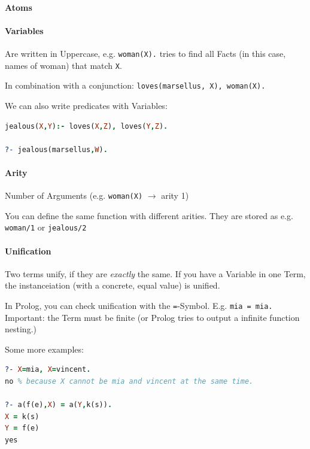 \paragraph{Atoms}


\paragraph{Variables}


Are written in Uppercase, e.g. \lstinline|woman(X).| tries to find all Facts (in this case, names of woman) that match \lstinline|X|.

In combination with a conjunction: \lstinline|loves(marsellus, X), woman(X).|

We can also write predicates with Variables: 
\begin{lstlisting}[language=Prolog]
jealous(X,Y):- loves(X,Z), loves(Y,Z).

?- jealous(marsellus,W).
\end{lstlisting}

\paragraph{Arity}

Number of Arguments (e.g. \lstinline|woman(X)| $\rightarrow$ arity 1)

You can define the same function with different arities. They are stored as e.g. \lstinline|woman/1| or \lstinline|jealous/2|

\paragraph{Unification}

Two terms unify, if they are \emph{exactly} the same. If you have a Variable in one Term, the instanceiation (with a concrete, equal value) is unified.

In Prolog, you can check unification with the \lstinline|=|-Symbol. E.g. \lstinline|mia = mia.| Important: the Term must be finite (or Prolog tries to output a infinite function nesting.)

Some more examples:
\begin{lstlisting}[language=Prolog]
?- X=mia, X=vincent.
no % because X cannot be mia and vincent at the same time.

?- a(f(e),X) = a(Y,k(s)).
X = k(s)
Y = f(e)
yes
\end{lstlisting}

